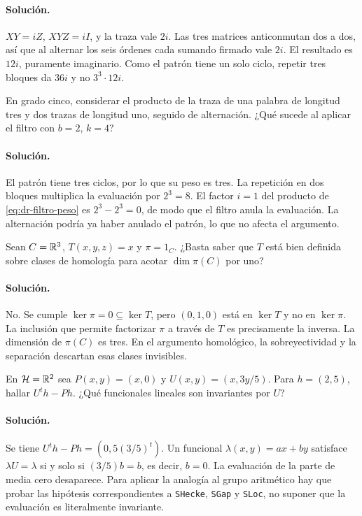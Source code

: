 \paragraph{Solución.} $XY=iZ$, $XYZ=iI$, y la traza vale $2i$. Las tres matrices anticonmutan dos a dos, así que al alternar los seis órdenes cada sumando firmado vale $2i$. El resultado es $12i$, puramente imaginario. Como el patrón tiene un solo ciclo, repetir tres bloques da $36i$ y no $3^3\cdot12i$.

\begin{ejercicio}
En grado cinco, considerar el producto de la traza de una palabra de longitud tres y dos trazas de longitud uno, seguido de alternación. ¿Qué sucede al aplicar el filtro con $b=2$, $k=4$?
\end{ejercicio}
\paragraph{Solución.} El patrón tiene tres ciclos, por lo que su peso es tres. La repetición en dos bloques multiplica la evaluación por $2^3=8$. El factor $i=1$ del producto de \eqref{eq:dr-filtro-peso} es $2^3-2^3=0$, de modo que el filtro anula la evaluación. La alternación podría ya haber anulado el patrón, lo que no afecta el argumento.

\begin{ejercicio}
Sean $C=\mathbb{R}^3$, $T(x,y,z)=x$ y $\pi=1_C$. ¿Basta saber que $T$ está bien definida sobre clases de homología para acotar $\dim\pi(C)$ por uno?
\end{ejercicio}
\paragraph{Solución.} No. Se cumple $\ker\pi=0\subseteq\ker T$, pero $(0,1,0)$ está en $\ker T$ y no en $\ker\pi$. La inclusión que permite factorizar $\pi$ a través de $T$ es precisamente la inversa. La dimensión de $\pi(C)$ es tres. En el argumento homológico, la sobreyectividad y la separación descartan esas clases invisibles.

\begin{ejercicio}
En $\mathcal H=\mathbb{R}^2$ sea $P(x,y)=(x,0)$ y $U(x,y)=(x,3y/5)$. Para $h=(2,5)$, hallar $U^t h-Ph$. ¿Qué funcionales lineales son invariantes por $U$?
\end{ejercicio}
\paragraph{Solución.} Se tiene $U^th-Ph=(0,5(3/5)^t)$. Un funcional $\lambda(x,y)=ax+by$ satisface $\lambda U=\lambda$ si y solo si $(3/5)b=b$, es decir, $b=0$. La evaluación de la parte de media cero desaparece. Para aplicar la analogía al grupo aritmético hay que probar las hipótesis correspondientes a \texttt{SHecke}, \texttt{SGap} y \texttt{SLoc}, no suponer que la evaluación es literalmente invariante.

